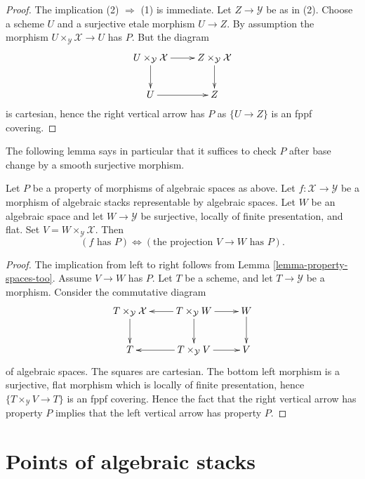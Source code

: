 \begin{proof}
The implication (2) $\Rightarrow$ (1) is immediate.
Let $Z \to \mathcal{Y}$ be as in (2). Choose a scheme $U$ and a
surjective etale morphism $U \to Z$. By assumption the morphism
$U \times_{\mathcal{Y}} \mathcal{X} \to U$ has $P$. But the diagram
$$
\xymatrix{
U \times_{\mathcal{Y}} \mathcal{X} \ar[d] \ar[r] &
Z \times_{\mathcal{Y}} \mathcal{X} \ar[d] \\
U \ar[r] & Z
}
$$
is cartesian, hence the right vertical arrow has $P$ as
$\{U \to Z\}$ is an fppf covering.
\end{proof}

\noindent
The following lemma says in particular that it suffices to check $P$
after base change by a smooth surjective morphism.

\begin{lemma}
\label{lemma-check-property-covering}
Let $P$ be a property of morphisms of algebraic spaces as above.
Let $f : \mathcal{X} \to \mathcal{Y}$ be a morphism of algebraic stacks
representable by algebraic spaces.
Let $W$ be an algebraic space and let $W \to \mathcal{Y}$ be surjective,
locally of finite presentation, and flat.
Set $V = W \times_{\mathcal{Y}} \mathcal{X}$. Then
$$
(f\text{ has }P) \Leftrightarrow (\text{the projection }V \to W\text{ has }P).
$$
\end{lemma}

\begin{proof}
The implication from left to right follows from
Lemma \ref{lemma-property-spaces-too}.
Assume $V \to W$ has $P$. Let $T$ be a scheme, and let
$T \to \mathcal{Y}$ be a morphism. Consider the commutative diagram
$$
\xymatrix{
T \times_{\mathcal{Y}} \mathcal{X} \ar[d] &
T \times_{\mathcal{Y}} W \ar[d] \ar[l] \ar[r] &
W \ar[d] \\
T & T \times_{\mathcal{Y}} V \ar[l] \ar[r] & V
}
$$
of algebraic spaces. The squares are cartesian.
The bottom left morphism is a surjective, flat morphism which is locally of
finite presentation, hence $\{T \times_{\mathcal{Y}} V \to T\}$ is an
fppf covering. Hence the fact that the right vertical arrow has property
$P$ implies that the left vertical arrow has property $P$.
\end{proof}







\section{Points of algebraic stacks}
\label{section-points}


